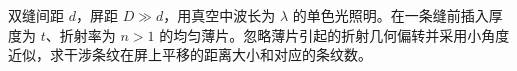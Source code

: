 双缝间距 $d$，屏距 $D\gg d$，用真空中波长为 $\lambda$ 的单色光照明。在一条缝前插入厚度为 $t$、折射率为 $n>1$ 的均匀薄片。忽略薄片引起的折射几何偏转并采用小角度近似，求干涉条纹在屏上平移的距离大小和对应的条纹数。
